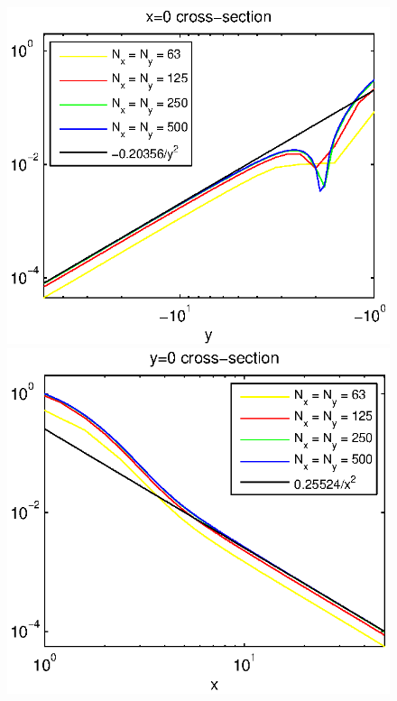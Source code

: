 \documentclass[preprint]{elsarticle}
\begin{document}
\begin{figure}[ht]
	\begin{minipage}[b]{0.5\linewidth}
		\raggedleft
		\includegraphics[width=\linewidth]{cross-sections/crossSectionLogX=0.eps}
	\end{minipage}	
	\begin{minipage}[b]{0.5\linewidth}
		\raggedright
		 \includegraphics[width=\linewidth]{cross-sections/crossSectionLogY=0.eps}

\end{minipage}
\end{figure}
\end{document}
